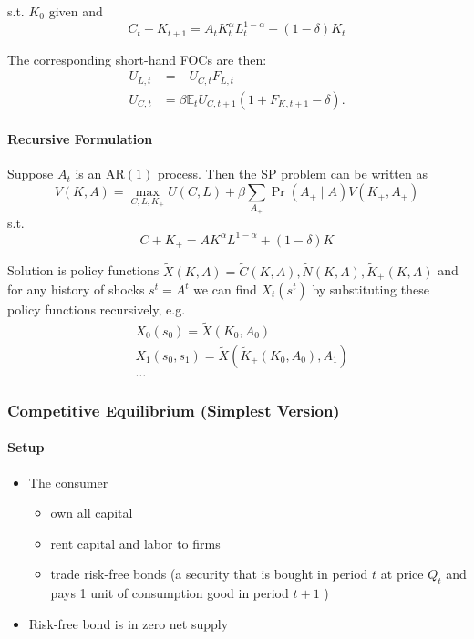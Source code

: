 \documentclass[10pt]{article}
\begin{document}
s.t. $K_0$ given and
$$
C_t+K_{t+1}=A_t K_t^\alpha L_t^{1-\alpha}+(1-\delta) K_t
$$

The corresponding short-hand FOCs are then:
$$
\begin{aligned}
U_{L, t} & =-U_{C, t} F_{L, t} \\
U_{C, t} & =\beta \mathbb{E}_t U_{C, t+1}\left(1+F_{K, t+1}-\delta\right) .
\end{aligned}
$$


\paragraph{Recursive Formulation}

Suppose $A_t$ is an $\mathrm{AR}(1)$ process. Then the SP problem can be written as
$$
V(K, A)=\max _{C, L, K_{+}} U(C, L)+\beta\sum_{A_{+}} \operatorname{Pr}\left(A_{+} \mid A\right) V\left(K_{+}, A_{+}\right)
$$
s.t.
$$
C+K_{+}=A K^\alpha L^{1-\alpha}+(1-\delta) K
$$

Solution is policy functions $\widetilde{X}(K, A)=\widetilde{C}(K, A), \widetilde{N}(K, A), \widetilde{K}_{+}(K, A)$ and for any history of shocks $s^t=A^t$ we can find $X_t\left(s^t\right)$ by substituting these policy functions recursively, e.g.
$$
\begin{aligned}
& X_0\left(s_0\right)=\widetilde{X}\left(K_0, A_0\right) \\
& X_1\left(s_0, s_1\right)=\widetilde{X}\left(\widetilde{K}_{+}\left(K_0, A_0\right), A_1\right) \\
& \ldots
\end{aligned}
$$


\subsubsection{Competitive Equilibrium (Simplest Version)}

\paragraph{Setup}

\begin{itemize}
    \item The consumer
        \begin{itemize}
            \item own all capital
            \item rent capital and labor to firms
            \item trade risk-free bonds (a security that is bought in period $t$ at price $Q_t$ and pays 1 unit of consumption good in period $t+1$ )
        \end{itemize}
    \item Risk-free bond is in zero net supply
\end{itemize}
\end{document}
